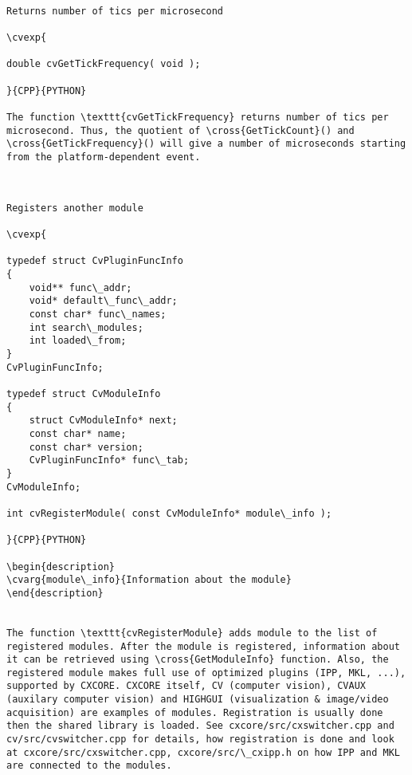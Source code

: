 \label{GetTickFrequency}
\begin{verbatim}

Returns number of tics per microsecond

\cvexp{

double cvGetTickFrequency( void );

}{CPP}{PYTHON}

The function \texttt{cvGetTickFrequency} returns number of tics per microsecond. Thus, the quotient of \cross{GetTickCount}() and \cross{GetTickFrequency}() will give a number of microseconds starting from the platform-dependent event.


\end{verbatim}
\label{RegisterModule}
\begin{verbatim}

Registers another module

\cvexp{

typedef struct CvPluginFuncInfo
{
    void** func\_addr;
    void* default\_func\_addr;
    const char* func\_names;
    int search\_modules;
    int loaded\_from;
}
CvPluginFuncInfo;

typedef struct CvModuleInfo
{
    struct CvModuleInfo* next;
    const char* name;
    const char* version;
    CvPluginFuncInfo* func\_tab;
}
CvModuleInfo;

int cvRegisterModule( const CvModuleInfo* module\_info );

}{CPP}{PYTHON}

\begin{description}
\cvarg{module\_info}{Information about the module}
\end{description}


The function \texttt{cvRegisterModule} adds module to the list of registered modules. After the module is registered, information about it can be retrieved using \cross{GetModuleInfo} function. Also, the registered module makes full use of optimized plugins (IPP, MKL, ...), supported by CXCORE. CXCORE itself, CV (computer vision), CVAUX (auxilary computer vision) and HIGHGUI (visualization & image/video acquisition) are examples of modules. Registration is usually done then the shared library is loaded. See cxcore/src/cxswitcher.cpp and cv/src/cvswitcher.cpp for details, how registration is done and look at cxcore/src/cxswitcher.cpp, cxcore/src/\_cxipp.h on how IPP and MKL are connected to the modules.


\end{verbatim}
\label{GetModuleInfo}
